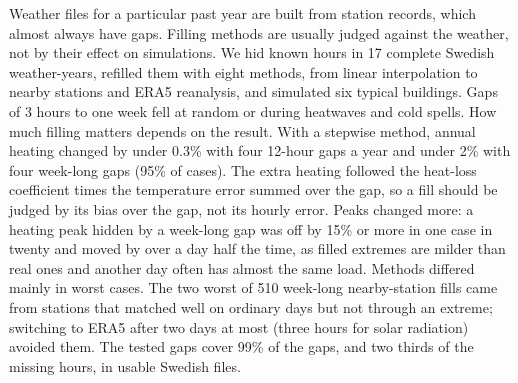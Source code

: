 Weather files for a particular past year are built from station records, which almost always have gaps. Filling methods are usually judged against the weather, not by their effect on simulations. We hid known hours in 17 complete Swedish weather-years, refilled them with eight methods, from linear interpolation to nearby stations and ERA5 reanalysis, and simulated six typical buildings. Gaps of 3 hours to one week fell at random or during heatwaves and cold spells. How much filling matters depends on the result. With a stepwise method, annual heating changed by under 0.3\% with four 12-hour gaps a year and under 2\% with four week-long gaps (95\% of cases). The extra heating followed the heat-loss coefficient times the temperature error summed over the gap, so a fill should be judged by its bias over the gap, not its hourly error. Peaks changed more: a heating peak hidden by a week-long gap was off by 15\% or more in one case in twenty and moved by over a day half the time, as filled extremes are milder than real ones and another day often has almost the same load. Methods differed mainly in worst cases. The two worst of 510 week-long nearby-station fills came from stations that matched well on ordinary days but not through an extreme; switching to ERA5 after two days at most (three hours for solar radiation) avoided them. The tested gaps cover 99\% of the gaps, and two thirds of the missing hours, in usable Swedish files.
